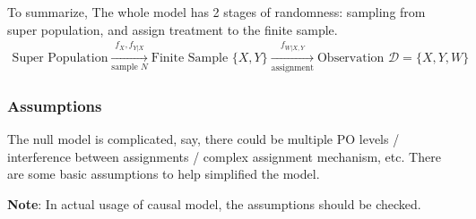     To summarize, The whole model has 2 stages of randomness: sampling from super population, and assign treatment to the finite sample.
\begin{align}
    \text{Super Population}\xrightarrow[\text{sample }N]{f_{X}, f_{Y|X}}\text{Finite Sample }\{X,Y\}\xrightarrow[\text{assignment}]{f_{W|X,Y}}\text{Observation }\mathcal{D}=\{X,Y,W\}
\end{align}


\subsubsection{Assumptions}

The null model is complicated, say, there could be multiple PO levels / interference between assignments / complex assignment mechanism, etc. There are some basic assumptions to help simplified the model.

\textbf{Note}: In actual usage of causal model, the assumptions should be checked.  

